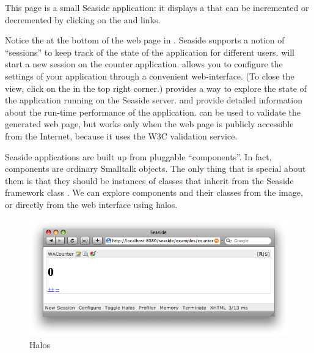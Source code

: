 \documentclass[a4paper,10pt,twoside]{book}
\begin{document}
\noindent
This page is a small Seaside application: it displays a  that can be incremented or decremented by clicking on the \link{++} and \link{--\,--} links.

\noindent
{}

Notice the  at the bottom of the web page in .
Seaside supports a notion of ``sessions'' to keep track of the state of the application for different users.
 will start a new session on the counter application.
 allows you to configure the settings of your application through a convenient web-interface.
(To close the  view, click on the  in the top right corner.)
 provides a way to explore the state of the application running on the Seaside server.
 and  provide detailed information about the run-time performance of the application.
 can be used to validate the generated web page, but works only  when the web page is publicly accessible from the Internet, because it uses the W3C validation service.

Seaside applications are built up from pluggable ``components''.
In fact, components are ordinary Smalltalk objects.
The only thing that is special about them is that they should be instances of classes that inherit from the Seaside framework class .
We can explore components and their classes from the \pharo image, or directly from the web interface using halos.

\begin{figure}[ht]
\begin{center}
\includegraphics[width=\textwidth]{counterHalos}
\caption{Halos}
\end{center}
\end{figure}
\end{document}
